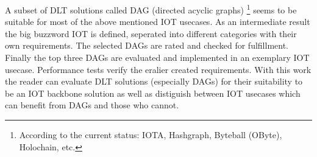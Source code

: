 \documentclass[
    ngerman,american
    ]{scrartcl}
\newcommand{\lang}{en}
\begin{document}
\begin{description}[style=unboxed]
            \item [\questionThree{\lang}]
                A subset of DLT solutions called DAG (directed acyclic graphs) \footnote{According to the current status: IOTA, Hashgraph, Byteball (OByte), Holochain, etc.} seems to be suitable for most of the above mentioned IOT usecases.
                As an intermediate result the big buzzword IOT is defined, seperated into different categories with their own requirements. The selected DAGs are rated and checked for fulfillment.
                Finally the top three DAGs are evaluated and implemented in an exemplary IOT usecase. Performance tests verify the eralier created requirements.
                With this work the reader can evaluate DLT solutions (especially DAGs) for their suitability to be an IOT backbone solution as well as distiguish between IOT usecases which can benefit from DAGs and those who cannot.



\end{description}
\end{document}
